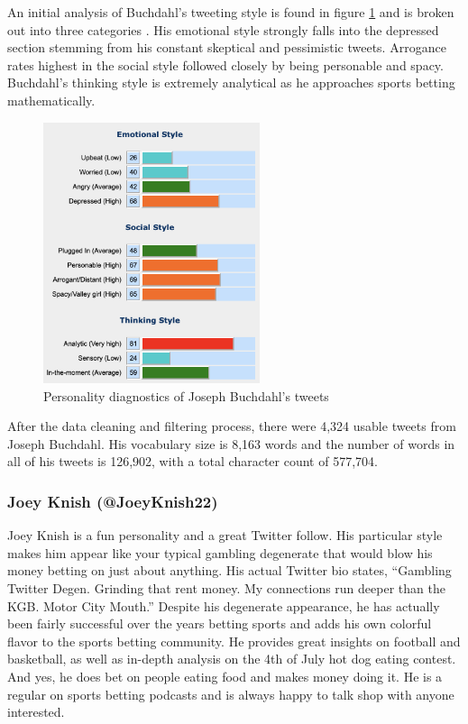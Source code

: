 \documentclass[5p,authoryear]{elsarticle}
\begin{document}
An initial analysis of Buchdahl’s tweeting style is found in figure \ref{buch_personality} and is broken out into three categories \citep{Anal_words}. His emotional style strongly falls into the depressed section stemming from his constant skeptical and pessimistic tweets. Arrogance rates highest in the social style followed closely by being personable and spacy. Buchdahl’s thinking style is extremely analytical as he approaches sports betting mathematically.


\begin{figure}[!htb] \centering
	\includegraphics[width=2.5in]{figures/personality_Xpert.png}
	\caption[]{Personality diagnostics of Joseph Buchdahl’s tweets} 
	\label{buch_personality} 
\end{figure}


After the data cleaning and filtering process, there were 4,324 usable tweets from Joseph Buchdahl. His vocabulary size is 8,163 words and the number of words in all of his tweets is 126,902, with a total character count of 577,704.


\subsubsection{Joey Knish (@JoeyKnish22)}\label{knish}

Joey Knish is a fun personality and a great Twitter follow. His particular style makes him appear like your typical gambling degenerate that would blow his money betting on just about anything. His actual Twitter bio states, “Gambling Twitter Degen. Grinding that rent money. My connections run deeper than the KGB. Motor City Mouth.” Despite his degenerate appearance, he has actually been fairly successful over the years betting sports and adds his own colorful flavor to the sports betting community. He provides great insights on football and basketball, as well as in-depth analysis on the 4th of July hot dog eating contest. And yes, he does bet on people eating food and makes money doing it. He is a regular on sports betting podcasts and is always happy to talk shop with anyone interested.
\end{document}
